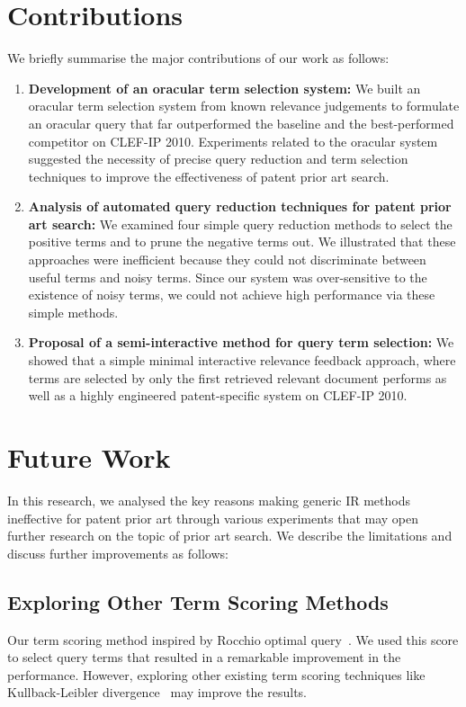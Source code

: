 \section{Contributions}
\label{sec:contributions}
We briefly summarise the major contributions of our work as follows:
\begin{enumerate}
\item \textbf{Development of an oracular term selection system: }We built an oracular term selection system from known relevance judgements to formulate an oracular query that far outperformed the baseline and the best-performed competitor on CLEF-IP 2010. 
Experiments related to the oracular system suggested the necessity of precise query
reduction and term selection techniques to improve the effectiveness of patent
prior art search.
\item \textbf{Analysis of automated query reduction techniques for patent prior art search: } We examined four simple query reduction methods to select the positive terms and to prune the negative terms out. We illustrated that these approaches were inefficient because they could not discriminate between useful terms and noisy terms. Since our system was over-sensitive to the existence of noisy terms, we could not achieve high performance via these simple methods. 
\item \textbf{Proposal of a semi-interactive method for query term selection: }We showed that a simple minimal interactive relevance feedback approach, where terms are selected by only the first retrieved relevant document performs as well as a highly engineered patent-specific system on CLEF-IP 2010. 
\end{enumerate}

\section{Future Work}
\label{sec:future}
In this research, we analysed the key reasons making generic IR methods ineffective for patent prior art through various experiments that may open further research on the topic of prior art search. We describe the limitations and discuss further improvements as follows: 
\subsection{Exploring Other Term Scoring Methods}
\label{subsec:ExploringTermScoringMethods}
Our term scoring method inspired by Rocchio optimal query~\citep[p.181]{manning2008introduction}. We used this score to select query terms that resulted in a remarkable improvement in the performance. However, exploring other existing term scoring techniques like Kullback-Leibler divergence~\citep{Baeza-Yates2011} may improve the results.
